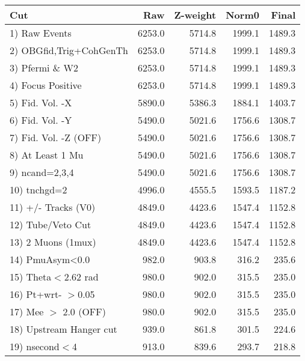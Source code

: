 \begin{table}[h!]\centering
 \begin{tabular}{||l||r|r|r|r||}
 \hline
 \hline
 Cut & Raw & Z-weight & Norm0 & Final \\
 \hline
  1) Raw Events           &      6253.0 &      5714.8 &      1999.1 &      1489.3 \\
  2) OBGfid,Trig+CohGenTh &      6253.0 &      5714.8 &      1999.1 &      1489.3 \\
  3) Pfermi \& W2         &      6253.0 &      5714.8 &      1999.1 &      1489.3 \\
  4) Focus Positive       &      6253.0 &      5714.8 &      1999.1 &      1489.3 \\
  5) Fid. Vol. -X         &      5890.0 &      5386.3 &      1884.1 &      1403.7 \\
  6) Fid. Vol. -Y         &      5490.0 &      5021.6 &      1756.6 &      1308.7 \\
  7) Fid. Vol. -Z (OFF)   &      5490.0 &      5021.6 &      1756.6 &      1308.7 \\
  8) At Least 1 Mu        &      5490.0 &      5021.6 &      1756.6 &      1308.7 \\
  9) ncand=2,3,4          &      5490.0 &      5021.6 &      1756.6 &      1308.7 \\
 10) tnchgd=2             &      4996.0 &      4555.5 &      1593.5 &      1187.2 \\
 11) +/- Tracks (V0)      &      4849.0 &      4423.6 &      1547.4 &      1152.8 \\
 12) Tube/Veto Cut        &      4849.0 &      4423.6 &      1547.4 &      1152.8 \\
 13) 2 Muons (1mux)       &      4849.0 &      4423.6 &      1547.4 &      1152.8 \\
 14) PmuAsym<0.0          &       982.0 &       903.8 &       316.2 &       235.6 \\
 15) Theta$<$2.62 rad     &       980.0 &       902.0 &       315.5 &       235.0 \\
 16) Pt+wrt- $>$0.05      &       980.0 &       902.0 &       315.5 &       235.0 \\
 17) Mee $>$ 2.0  (OFF)   &       980.0 &       902.0 &       315.5 &       235.0 \\
 18) Upstream Hanger cut  &       939.0 &       861.8 &       301.5 &       224.6 \\
 19) nsecond$<$4          &       913.0 &       839.6 &       293.7 &       218.8 \\

\end{tabular}
\end{table}
